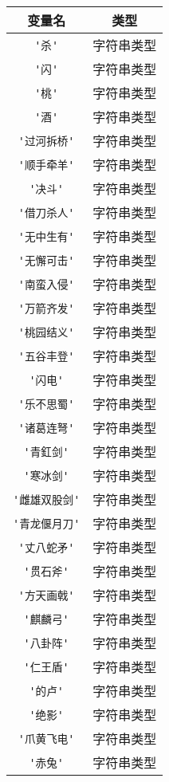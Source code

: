 \begin{center}
\begin{longtable}{|c|c|}
\hline \textbf{变量名} & \textbf{类型} \\
\hline \verb|'杀'| & 字符串类型 \\
\hline \verb|'闪'| & 字符串类型 \\
\hline \verb|'桃'| & 字符串类型 \\
\hline \verb|'酒'| & 字符串类型 \\
\hline \verb|'过河拆桥'| & 字符串类型 \\
\hline \verb|'顺手牵羊'| & 字符串类型 \\
\hline \verb|'决斗'| & 字符串类型 \\
\hline \verb|'借刀杀人'| & 字符串类型 \\
\hline \verb|'无中生有'| & 字符串类型 \\
\hline \verb|'无懈可击'| & 字符串类型 \\
\hline \verb|'南蛮入侵'| & 字符串类型 \\
\hline \verb|'万箭齐发'| & 字符串类型 \\
\hline \verb|'桃园结义'| & 字符串类型 \\
\hline \verb|'五谷丰登'| & 字符串类型 \\
\hline \verb|'闪电'| & 字符串类型 \\
\hline \verb|'乐不思蜀'| & 字符串类型 \\
\hline \verb|'诸葛连弩'| & 字符串类型 \\
\hline \verb|'青釭剑'| & 字符串类型 \\
\hline \verb|'寒冰剑'| & 字符串类型 \\
\hline \verb|'雌雄双股剑'| & 字符串类型 \\
\hline \verb|'青龙偃月刀'| & 字符串类型 \\
\hline \verb|'丈八蛇矛'| & 字符串类型 \\
\hline \verb|'贯石斧'| & 字符串类型 \\
\hline \verb|'方天画戟'| & 字符串类型 \\
\hline \verb|'麒麟弓'| & 字符串类型 \\
\hline \verb|'八卦阵'| & 字符串类型 \\
\hline \verb|'仁王盾'| & 字符串类型 \\
\hline \verb|'的卢'| & 字符串类型 \\
\hline \verb|'绝影'| & 字符串类型 \\
\hline \verb|'爪黄飞电'| & 字符串类型 \\
\hline \verb|'赤兔'| & 字符串类型 \\

\end{longtable}
\end{center}
